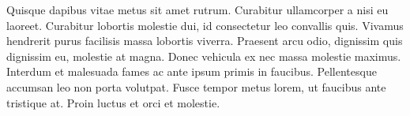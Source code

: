 Quisque dapibus vitae metus sit amet rutrum. Curabitur ullamcorper a nisi eu laoreet. Curabitur lobortis molestie dui, id consectetur leo convallis quis. Vivamus hendrerit purus facilisis massa lobortis viverra. Praesent arcu odio, dignissim quis dignissim eu, molestie at magna. Donec vehicula ex nec massa molestie maximus. Interdum et malesuada fames ac ante ipsum primis in faucibus. Pellentesque accumsan leo non porta volutpat. Fusce tempor metus lorem, ut faucibus ante tristique at. Proin luctus et orci et molestie.